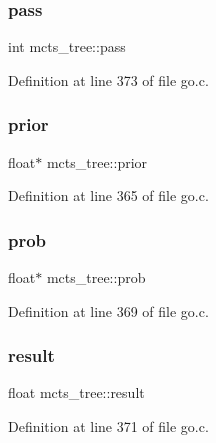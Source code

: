 \subsubsection{\texorpdfstring{pass}{pass}}
{\footnotesize\ttfamily int mcts\+\_\+tree\+::pass}



Definition at line 373 of file go.\+c.

\mbox{\label{structmcts__tree_aa05f18bb6c906a41a9bd35032f09d10f}} 
\subsubsection{\texorpdfstring{prior}{prior}}
{\footnotesize\ttfamily float$\ast$ mcts\+\_\+tree\+::prior}



Definition at line 365 of file go.\+c.

\mbox{\label{structmcts__tree_ad285cf5c855a7322c9e92f8c193c553b}} 
\subsubsection{\texorpdfstring{prob}{prob}}
{\footnotesize\ttfamily float$\ast$ mcts\+\_\+tree\+::prob}



Definition at line 369 of file go.\+c.

\mbox{\label{structmcts__tree_a28b1271b89ebe12d66448a5f07dd1b1e}} 
\subsubsection{\texorpdfstring{result}{result}}
{\footnotesize\ttfamily float mcts\+\_\+tree\+::result}



Definition at line 371 of file go.\+c.

\mbox{\label{structmcts__tree_a454a9de890a8bbe762b7ffd430e46927}} 
